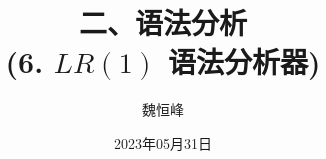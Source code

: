 \documentclass[]{beamer}
\title[语法分析]{二、语法分析 \\ (6. $LR(1)$ 语法分析器)}
\author[魏恒峰]{\large 魏恒峰}
\institute{hfwei@nju.edu.cn}
\date{2023年05月31日}
\begin{document}
\maketitle



\thankyou{}

\end{document}

